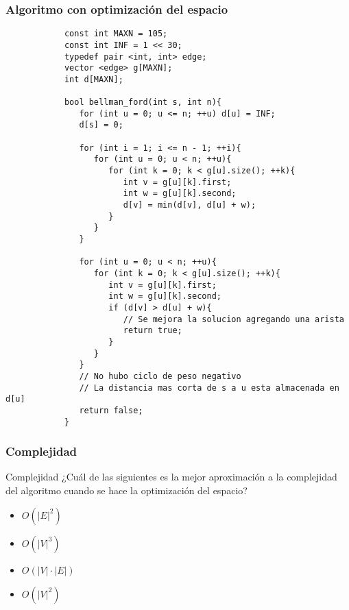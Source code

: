 \documentclass{beamer}
\begin{document}
	\begin{frame}
		\frametitle{Algoritmo con optimización del espacio}
		\begin{lstlisting}
			const int MAXN = 105;
			const int INF = 1 << 30;
			typedef pair <int, int> edge;
			vector <edge> g[MAXN];
			int d[MAXN];

			bool bellman_ford(int s, int n){
			   for (int u = 0; u <= n; ++u) d[u] = INF;
			   d[s] = 0;

			   for (int i = 1; i <= n - 1; ++i){
			      for (int u = 0; u < n; ++u){
			         for (int k = 0; k < g[u].size(); ++k){
			            int v = g[u][k].first;
			            int w = g[u][k].second;
			            d[v] = min(d[v], d[u] + w);
			         }
			      }
			   }

			   for (int u = 0; u < n; ++u){
			      for (int k = 0; k < g[u].size(); ++k){
			         int v = g[u][k].first;
			         int w = g[u][k].second;
			         if (d[v] > d[u] + w){
			            // Se mejora la solucion agregando una arista
			            return true;
			         }
			      }
			   }
			   // No hubo ciclo de peso negativo
			   // La distancia mas corta de s a u esta almacenada en d[u]
			   return false;
			}
		\end{lstlisting}
	\end{frame}
	
	\begin{frame}
		\frametitle{Complejidad}
		\begin{alertblock}{Complejidad}
			¿Cuál de las siguientes es la mejor aproximación a la complejidad del algoritmo cuando se hace la optimización del espacio?
			\begin{itemize}
				\item<1> [a] $O(|E| ^ 2)$
				\item<1> [b] $O(|V| ^ 3)$
				\item<1,2> [c] $O(|V| \cdot |E|)$
				\item<1> [d] $O(|V|^2)$
			\end{itemize}
		\end{alertblock}
	\end{frame}
	
\end{document}

